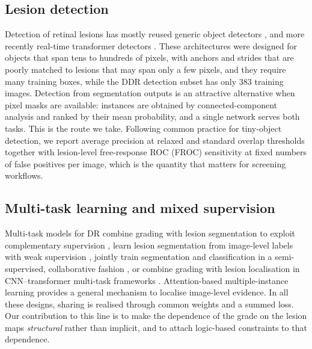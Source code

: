 \subsection{Lesion detection}
Detection of retinal lesions has mostly reused generic object detectors \citep{ren2017fasterrcnn,tian2019fcos}, and more recently real-time transformer detectors \citep{zhao2024rtdetr}. These architectures were designed for objects that span tens to hundreds of pixels, with anchors and strides that are poorly matched to lesions that may span only a few pixels, and they require many training boxes, while the DDR detection subset has only 383 training images. Detection from segmentation outputs is an attractive alternative when pixel masks are available: instances are obtained by connected-component analysis and ranked by their mean probability, and a single network serves both tasks. This is the route we take. Following common practice for tiny-object detection, we report average precision at relaxed and standard overlap thresholds \citep{padilla2021detmetrics} together with lesion-level free-response ROC (FROC) sensitivity at fixed numbers of false positives per image, which is the quantity that matters for screening workflows.

\subsection{Multi-task learning and mixed supervision}
Multi-task models for DR combine grading with lesion segmentation to exploit complementary supervision \citep{foo2020multitask}, learn lesion segmentation from image-level labels with weak supervision \citep{playout2019}, jointly train segmentation and classification in a semi-supervised, collaborative fashion \citep{zhou2019collab}, or combine grading with lesion localisation in CNN--transformer multi-task frameworks \citep{vijayalakshmi2025multitask}. Attention-based multiple-instance learning \citep{ilse2018attentionmil} provides a general mechanism to localise image-level evidence. In all these designs, sharing is realised through common weights and a summed loss. Our contribution to this line is to make the dependence of the grade on the lesion maps \emph{structural} rather than implicit, and to attach logic-based constraints to that dependence.

